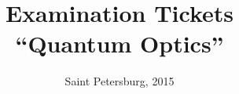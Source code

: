 \title{Examination Tickets \\ ``Quantum Optics''}
\author{}
\date{Saint Petersburg, 2015}
\maketitle
\newpage